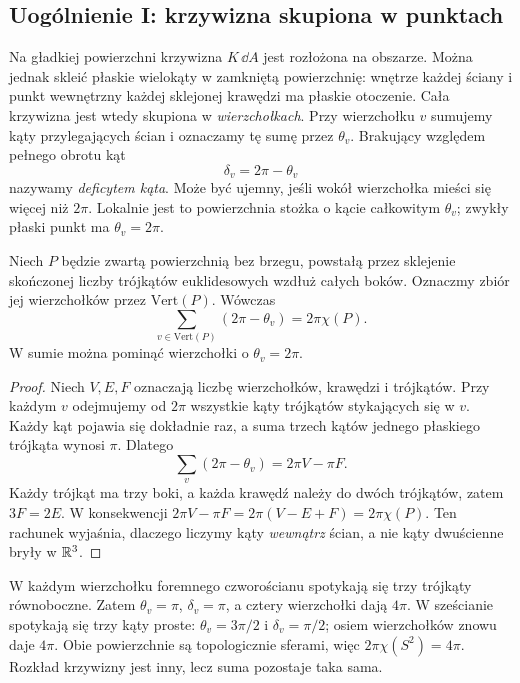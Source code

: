 \subsection*{Uogólnienie I: krzywizna skupiona w punktach}

Na gładkiej powierzchni krzywizna $K\,\dd A$ jest
rozłożona na obszarze. Można jednak skleić płaskie
wielokąty w zamkniętą powierzchnię: wnętrze każdej ściany
i punkt wewnętrzny każdej sklejonej krawędzi ma płaskie
otoczenie. Cała krzywizna jest wtedy skupiona w
\emph{wierzchołkach}. Przy wierzchołku $v$ sumujemy kąty
przylegających ścian i oznaczamy tę sumę przez $\theta_v$.
Brakujący względem pełnego obrotu kąt
\begin{equation}\label{eq:gb-deficyt-kata}
 \delta_v=2\pi-\theta_v
\end{equation}
nazywamy \emph{deficytem kąta}. Może być ujemny, jeśli
wokół wierzchołka mieści się więcej niż $2\pi$.
Lokalnie jest to powierzchnia stożka o kącie całkowitym
$\theta_v$; zwykły płaski punkt ma $\theta_v=2\pi$.

\begin{twierdzenie}
\label{thm:gb-wielosciany}
Niech $P$ będzie zwartą powierzchnią bez brzegu,
powstałą przez sklejenie skończonej liczby trójkątów
euklidesowych wzdłuż całych boków. Oznaczmy zbiór
jej wierzchołków przez $\mathrm{Vert}(P)$. Wówczas
\begin{equation}\label{eq:gb-wielosciany}
 \boxed{\displaystyle\sum_{v\in\mathrm{Vert}(P)}(2\pi-\theta_v)
                      =2\pi\chi(P).}
\end{equation}
W sumie można pominąć wierzchołki o $\theta_v=2\pi$.
\end{twierdzenie}
\begin{proof}
Niech $V,E,F$ oznaczają liczbę wierzchołków, krawędzi
i trójkątów. Przy każdym $v$ odejmujemy od $2\pi$
wszystkie kąty trójkątów stykających się w $v$.
Każdy kąt pojawia się dokładnie raz, a suma trzech kątów
jednego płaskiego trójkąta wynosi $\pi$. Dlatego
\[
 \sum_v(2\pi-\theta_v)=2\pi V-\pi F.
\]
Każdy trójkąt ma trzy boki, a każda krawędź należy do
dwóch trójkątów, zatem $3F=2E$. W konsekwencji
$2\pi V-\pi F=2\pi(V-E+F)=2\pi\chi(P)$.
Ten rachunek wyjaśnia, dlaczego liczymy kąty \emph{wewnątrz}
ścian, a nie kąty dwuścienne bryły w $\mathbb{R}^3$.
\end{proof}

\begin{przyklad}
W każdym wierzchołku foremnego czworościanu spotykają
się trzy trójkąty równoboczne. Zatem $\theta_v=\pi$,
$\delta_v=\pi$, a cztery wierzchołki dają $4\pi$.
W sześcianie spotykają się trzy kąty proste:
$\theta_v=3\pi/2$ i $\delta_v=\pi/2$; osiem
wierzchołków znowu daje $4\pi$. Obie powierzchnie są
topologicznie sferami, więc $2\pi\chi(S^2)=4\pi$.
Rozkład krzywizny jest inny, lecz suma pozostaje taka sama.
\end{przyklad}

